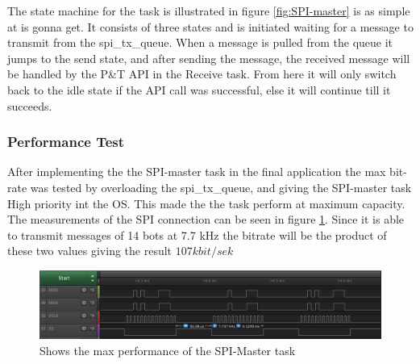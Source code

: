 The state machine for the task is illustrated in figure \ref{fig:SPI-master} is as simple at is gonna get. It consists of three states and is initiated waiting for a message to transmit from the spi\_tx\_queue. When a message is pulled from the queue it jumps to the send state, and after sending the message, the received message will be handled by the P\&T API in the Receive task. From here it will only switch back to the idle state if the API call was successful, else it will continue till it succeeds. 


\subsubsection{Performance Test} 
\label{sec:PerformanceTest}
After implementing the the SPI-master task in the final application the max bit-rate was tested by overloading the spi\_tx\_queue, and giving the SPI-master task High priority int the OS. This made the the task perform at maximum capacity. The measurements of the SPI connection can be seen in figure \ref{fig:HightPerformance}. Since it is able to transmit messages of 14 bots at 7.7 kHz the bitrate will be the product of these two values giving the result $107 kbit/sek$


\begin{figure}
	\centering
	\includegraphics[scale = 0.7] {Billeder/HightPerformance}
	\caption{Shows the max performance of the SPI-Master task}
	\label{fig:HightPerformance}
\end{figure}
 

 



